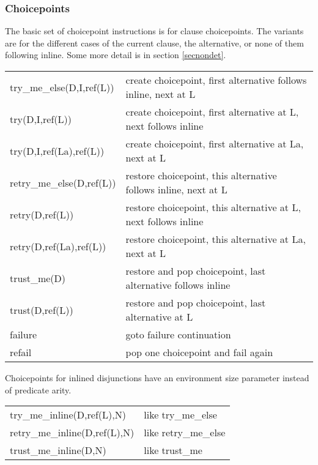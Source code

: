 \subsubsection{Choicepoints}
The basic set of choicepoint instructions is for clause choicepoints.
The variants are for the different cases of the current clause, the
alternative, or none of them following inline.
Some more detail is in section \ref{secnondet}.

\begin{tabular}{|p{}|p{}|}
\hline
try_me_else(D,I,ref(L))         & create choicepoint, first alternative follows inline, next at L \\
try(D,I,ref(L))                 & create choicepoint, first alternative at L, next follows inline \\
try(D,I,ref(La),ref(L))         & create choicepoint, first alternative at La, next at L \\
retry_me_else(D,ref(L))         & restore choicepoint, this alternative follows inline, next at L \\
retry(D,ref(L))                 & restore choicepoint, this alternative at L, next follows inline \\
retry(D,ref(La),ref(L))         & restore choicepoint, this alternative at La, next at L \\
trust_me(D)                     & restore and pop choicepoint, last alternative follows inline \\
trust(D,ref(L))                 & restore and pop choicepoint, last alternative at L \\
\hline
failure                 & goto failure continuation \\
refail                  & pop one choicepoint and fail again \\
\hline
\end{tabular}

Choicepoints for inlined disjunctions have an environment size parameter
instead of predicate arity.

\begin{tabular}{|p{}|p{}|}
\hline
try_me_inline(D,ref(L),N)       & like try_me_else\\
retry_me_inline(D,ref(L),N)     & like retry_me_else\\
trust_me_inline(D,N)            & like trust_me\\
\hline
\end{tabular}

